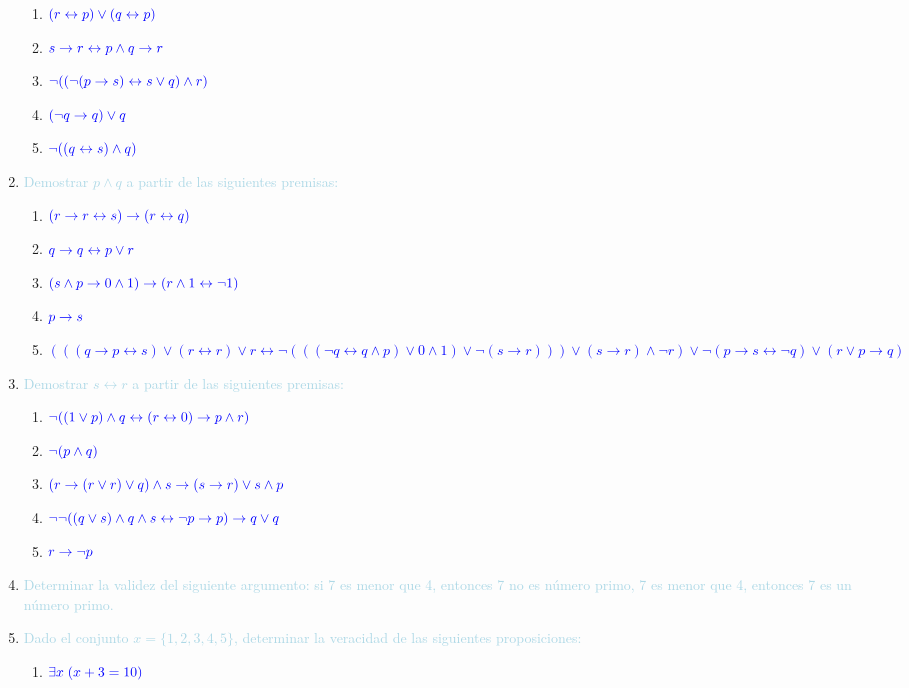 \documentclass[12pt]{article}
\newcommand{\lb}[1]{\textcolor{lightblue}{#1}}
\newcommand{\db}[1]{\textcolor{blue}{#1}}
\begin{document}
\begin{enumerate}[label=\color{red}\textbf{\arabic*)}, leftmargin=*]
      \begin{enumerate}[label=\color{red}\alph*)]
            \item $\db{(r\leftrightarrow p)\vee(q\leftrightarrow p)}$
            \item $\db{s\to r\leftrightarrow p\wedge q\to r}$
            \item $\db{\neg((\neg(p\to s)\leftrightarrow s\vee q)\wedge r)}$
            \item $\db{(\neg q\to q)\vee q}$
            \item $\db{\neg((q\leftrightarrow s)\wedge q)}$
      \end{enumerate}
      \item \lb{Demostrar $p\wedge q$ a partir de las siguientes premisas:}
      \begin{enumerate}[label=\color{red}\alph*)]
            \item $\db{(r\to r\leftrightarrow s)\to(r\leftrightarrow q)}$
            \item $\db{q\to q\leftrightarrow p\vee r}$
            \item $\db{(s\wedge p\to0\wedge 1)\to(r\wedge 1\leftrightarrow\neg1)}$
            \item $\db{p\to s}$
            \item \db{$(((q\to p\leftrightarrow s)\vee(r\leftrightarrow r)\vee r\leftrightarrow\neg(((\neg q\leftrightarrow q\wedge p)\vee0\wedge1)\vee\neg(s\to r)))\vee (s\to r)\wedge\neg r)\vee\neg(p\to s\leftrightarrow\neg q)\vee(r\vee p\to q)$}
      \end{enumerate}
      \item \lb{Demostrar $s\leftrightarrow r$ a partir de las siguientes premisas:}
      \begin{enumerate}[label=\color{red}\alph*)]
            \item $\db{\neg((1\vee p)\wedge q\leftrightarrow(r\leftrightarrow0)\to p\wedge r)}$
            \item $\db{\neg(p\wedge q)}$
            \item $\db{(r\to(r\vee r)\vee q)\wedge s\to(s\to r)\vee s\wedge p}$
            \item $\db{\neg\neg((q\vee s)\wedge q\wedge s\leftrightarrow\neg p\to p)\to q\vee q}$
            \item $\db{r\to\neg p}$
      \end{enumerate}
      \item \lb{Determinar la validez del siguiente argumento: si 7 es menor que 4, entonces 7 no es número primo, 7 es menor que 4, entonces 7 es un número primo.}
      \item \lb{Dado el conjunto $x=\{1,2,3,4,5\}$, determinar la veracidad de las siguientes proposiciones:}
      \begin{enumerate}[label=\color{red}\alph*)]
            \item $\db{\exists x\;(x+3=10)}$
            

\end{enumerate}
\end{enumerate}
\end{document}
